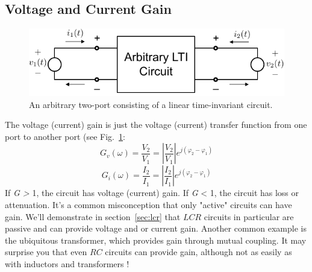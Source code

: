 \subsection{Voltage and Current Gain}
\begin{figure}[tb]
\centering
\includegraphics[width=.6\columnwidth]{mod1_3_1_twoport}
\caption{An arbitrary two-port consisting of a linear time-invariant circuit.}
\label{fig:twoportivgain}
\end{figure}
The voltage (current) gain is just the voltage (current) transfer function from one port to another port (see Fig.~\ref{fig:twoportivgain}:
    \begin{equation}
        {G_v}(\omega ) = \frac{{{V_2}}}{{{V_1}}} = \left| {\frac{{{V_2}}}{{{V_1}}}} \right|{e^{j({\varphi _2} - {\varphi _1})}}
    \end{equation}
    \begin{equation}
        {G_i}(\omega ) = \frac{{{I_2}}}{{{I_1}}} = \left| {\frac{{{I_2}}}{{{I_1}}}} \right|{e^{j({\varphi _2} - {\varphi _1})}}
    \end{equation}
If \textit{G > }1, the circuit has voltage (current) gain.   If \textit{G} < 1, the circuit has loss or attenuation.   It's a common misconception that only "active" circuits can have gain.  We'll demonstrate in section~\ref{sec:lcr} that $LCR$ circuits in particular are passive and can provide voltage and or current gain.  Another common example is the ubiquitous transformer, which provides gain through mutual coupling.  It may surprise you that even $RC$ circuits can provide gain, although not as easily as with inductors and transformers !
